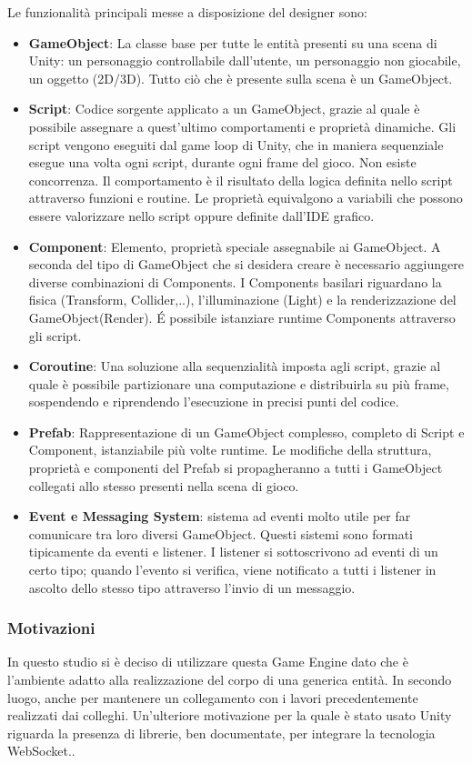 Le funzionalità principali messe a disposizione del designer sono:
\begin{itemize}
	\item \textbf{GameObject}: La classe base per tutte le entità presenti su una scena di Unity: un personaggio controllabile dall'utente, un personaggio non giocabile, un oggetto (2D/3D). Tutto ciò che è presente sulla scena è un GameObject.
	\item \textbf{Script}: Codice sorgente applicato a un GameObject, grazie al quale è possibile assegnare a quest'ultimo comportamenti e proprietà dinamiche. Gli script vengono eseguiti dal game loop di Unity, che in maniera sequenziale esegue una volta ogni script, durante ogni frame del gioco. Non esiste concorrenza. Il comportamento è il risultato della logica definita nello script attraverso funzioni e routine. Le proprietà equivalgono a variabili che possono essere valorizzare nello script oppure definite dall'IDE grafico.
	\item \textbf{Component}: Elemento, proprietà speciale assegnabile ai GameObject. A seconda del tipo di GameObject che si desidera creare è necessario aggiungere diverse combinazioni di Components. I Components basilari riguardano la fisica (Transform, Collider,..), l'illuminazione (Light) e la renderizzazione del GameObject(Render). \'E possibile istanziare runtime Components attraverso gli script.
	\item \textbf{Coroutine}: Una soluzione alla sequenzialità imposta agli script, grazie al quale è possibile partizionare una computazione e distribuirla su più frame, sospendendo e riprendendo l'esecuzione in precisi punti del codice.
	\item \textbf{Prefab}: Rappresentazione di un GameObject complesso, completo di Script e Component, istanziabile più volte runtime. Le modifiche della struttura, proprietà e componenti del Prefab si propagheranno a tutti i GameObject collegati allo stesso presenti nella scena di gioco.
	\item \textbf{Event e Messaging System}: sistema ad eventi molto utile per far comunicare tra loro diversi GameObject. Questi sistemi sono formati tipicamente da eventi e listener. I listener si sottoscrivono ad eventi di un certo tipo; quando l'evento si verifica, viene notificato a tutti i listener in ascolto dello stesso tipo attraverso l'invio di un messaggio.
\end{itemize}

\subsubsection*{Motivazioni}

In questo studio si è deciso di utilizzare questa Game Engine dato che è l'ambiente adatto alla realizzazione del corpo di una generica entità. In secondo luogo, anche per mantenere un collegamento con i lavori precedentemente realizzati dai colleghi\cite{amslaurea8424}\cite{amslaurea15657}\cite{amslaurea16100}\cite{amslaurea12270}. Un'ulteriore motivazione per la quale è stato usato Unity riguarda la presenza di librerie, ben documentate, per integrare la tecnologia WebSocket.\cite{websocket-sharp}. 